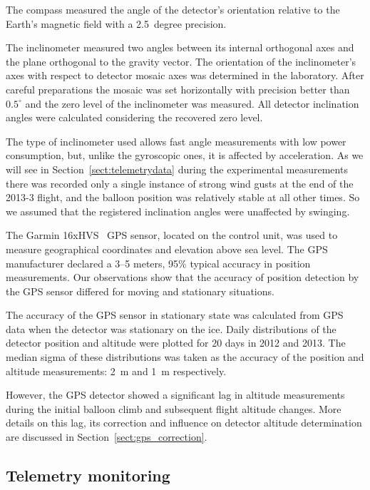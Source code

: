 \documentclass[universe,article,submit,moreauthors,pdftex]{Definitions/mdpi}
\begin{document}
The compass measured the angle of the detector's orientation relative to the Earth's magnetic field with a 2.5~degree precision.

The inclinometer measured two angles between its internal orthogonal axes and the plane orthogonal to the gravity vector. The orientation of the inclinometer's axes with respect to detector mosaic axes was determined in the laboratory. After careful preparations the mosaic was set horizontally with precision better than $0.5^\circ$ and the zero level of the inclinometer was measured. All detector inclination angles were calculated considering the recovered zero level.

The type of inclinometer used allows fast angle measurements with low power consumption, but, unlike the gyroscopic ones, it is affected by acceleration. As we will see in Section~\ref{sect:telemetrydata} during the experimental measurements there was recorded only a single instance of strong wind gusts at the end of the 2013-3 flight, and the balloon position was relatively stable at all other times. So we assumed that the registered inclination angles were unaffected by swinging.

The Garmin 16xHVS~\cite{GPS-module-specs} GPS sensor, located on the control unit, was used to measure geographical coordinates and elevation above sea level. The GPS manufacturer declared a 3–5 meters, 95\% typical accuracy in position measurements.
Our observations show that the accuracy of position detection by the GPS sensor differed for moving and stationary situations. 

The accuracy of the GPS sensor in stationary state was calculated from GPS data when the detector was stationary on the ice. Daily distributions of the detector position and altitude were plotted for 20 days in 2012 and 2013. The median sigma of these distributions was taken as the accuracy of the position and altitude measurements: 2~m and 1~m respectively.

However, the GPS detector showed a significant lag in altitude measurements during the initial balloon climb and subsequent flight altitude changes. More details on this lag, its correction and influence on detector altitude determination are discussed in Section~\ref{sect:gps_correction}.


\subsection{Telemetry monitoring\label{sect:telemetry}}
\end{document}
